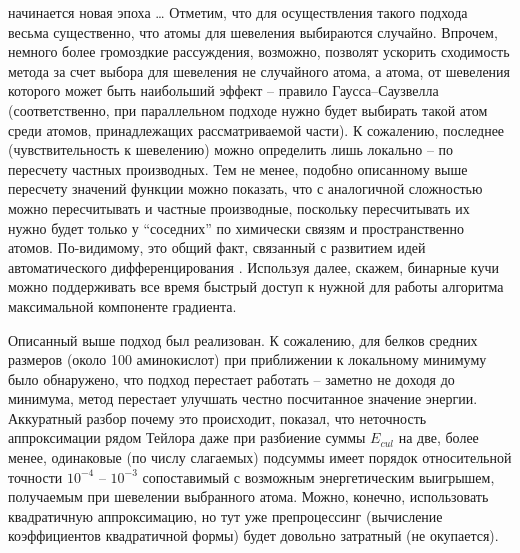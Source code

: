   начинается новая эпоха {\ldots} Отметим, что для осуществления такого 
  подхода весьма существенно, что атомы для шевеления выбираются случайно. 
  Впрочем, немного более громоздкие рассуждения, возможно, позволят ускорить 
  сходимость метода за счет выбора для шевеления не случайного атома, а атома, 
  от шевеления которого может быть наибольший эффект -- правило 
  Гаусса--Саузвелла \cite{nutini2015coordinate} (соответственно, при параллельном подходе нужно будет 
  выбирать такой атом среди атомов, принадлежащих рассматриваемой части). К 
  сожалению, последнее (чувствительность к шевелению) можно определить лишь 
  локально -- по пересчету частных производных. Тем не менее, подобно 
  описанному выше пересчету значений функции можно показать, что с аналогичной 
  сложностью можно пересчитывать и частные производные, поскольку пересчитывать их 
  нужно будет только у ``соседних'' по химически связям и пространственно 
  атомов. По-видимому, это общий факт, связанный с развитием идей 
  автоматического дифференцирования \cite{nocedal2006sequential}. Используя далее, скажем, бинарные 
  кучи \cite{cormen2001introduction} можно поддерживать все время быстрый доступ к нужной для работы 
  алгоритма максимальной компоненте градиента.

  Описанный выше подход был реализован. К сожалению, для белков средних размеров (около 100 аминокислот) при приближении к локальному минимуму было обнаружено, что подход перестает работать -- заметно не доходя до минимума, метод перестает улучшать честно посчитанное значение энергии. Аккуратный разбор почему это происходит, показал, что неточность аппроксимации рядом Тейлора даже при разбиение суммы $ E_{cul}$ на две, более менее, одинаковые (по числу слагаемых) подсуммы имеет порядок относительной точности $10^{-4}$ -- $10^{-3}$ сопоставимый с возможным энергетическим выигрышем, получаемым при шевелении выбранного атома. Можно, конечно, использовать квадратичную аппроксимацию, но тут уже препроцессинг (вычисление коэффициентов квадратичной формы) будет довольно затратный (не окупается). 

